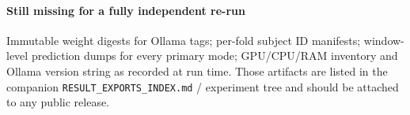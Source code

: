 \documentclass[journal]{IEEEtran}
\begin{document}
\paragraph{Still missing for a fully independent re-run}
Immutable weight digests for Ollama tags; per-fold subject ID manifests;
window-level prediction dumps for every primary mode; GPU/CPU/RAM inventory
and Ollama version string as recorded at run time. Those artifacts are listed
in the companion \texttt{RESULT\_EXPORTS\_INDEX.md} / experiment tree and
should be attached to any public release.



\end{document}
